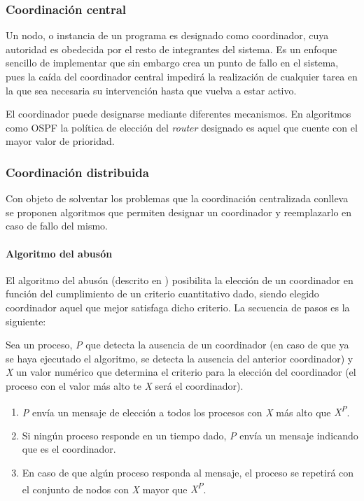 \subsubsection{Coordinación central}

Un nodo, o instancia de un programa es designado como coordinador, cuya autoridad es obedecida por el resto de integrantes del sistema. Es un enfoque sencillo de implementar que sin embargo crea un punto de fallo en el sistema, pues la caída del coordinador central impedirá la realización de cualquier tarea en la que sea necesaria su intervención hasta que vuelva a estar activo.

El coordinador puede designarse mediante diferentes mecanismos. En algoritmos como OSPF\cite{rfc2328} la política de elección del \textit{router} designado es aquel que cuente con el mayor valor de prioridad.
\subsubsection{Coordinación distribuida}

Con objeto de solventar los problemas que la coordinación centralizada conlleva se proponen algoritmos que permiten designar un coordinador y reemplazarlo en caso de fallo del mismo.

\paragraph{Algoritmo del abusón}

El algoritmo del abusón (descrito en \cite{Coulouris:2011:DSC:2029110:Ch15}) posibilita la elección de un coordinador en función del cumplimiento de un criterio cuantitativo dado, siendo elegido coordinador aquel que mejor satisfaga dicho criterio. La secuencia de pasos es la siguiente:

Sea un proceso, \textit{P} que detecta la ausencia de un coordinador (en caso de que ya se haya ejecutado el algoritmo, se detecta la ausencia del anterior coordinador) y \textit{X} un valor numérico que determina el criterio para la elección del coordinador (el proceso con el valor más alto te \textit{X} será el coordinador).
\begin{enumerate}
\item \textit{P} envía un mensaje de elección a todos los procesos con \textit{X} más alto que \textit{X\textsuperscript{P}}.
\item Si ningún proceso responde en un tiempo dado, \textit{P} envía un mensaje indicando que es el coordinador.
\item En caso de que algún proceso responda al mensaje, el proceso se repetirá con el conjunto de nodos con \textit{X} mayor que \textit{X\textsuperscript{P}}.
\end{enumerate}

